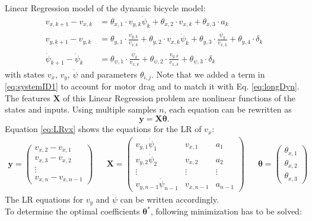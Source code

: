 Linear Regression model of the dynamic bicycle model:
\begin{subequations}\label{eq:systemID}
\begin{align}
    v_{x,k+1} - v_{x,k}&= \theta_{x,1} \cdot v_{y,k}\dot\psi_k + \theta_{x,2}\cdot v_{x,k}  + \theta_{x,3}\cdot a_k\label{eq:systemID1}\\
    v_{y,k+1}- v_{y,k} &= \theta_{y,1}\cdot  \frac{v_{y,k}}{v_{x,k}}+\theta_{y,2}\cdot v_{x,k}\dot\psi_k + \theta_{y,3}\cdot \frac{\dot\psi_k}{v_{x,k}}+\theta_{y,4}\cdot \delta_k\\
    \dot\psi_{k+1}-\dot\psi_k &= \theta_{\psi,1}\cdot \frac{\dot\psi_k}{v_{x,k}}+\theta_{\psi,2}\cdot \frac{v_{y,k}}{v_{x,k}}+\theta_{\psi,3}\cdot \delta_k
\end{align}
\end{subequations}
with states $v_x$, $v_y$, $\dot \psi$ and parameters $\theta_{i,j}$. Note that we added a term in \eqref{eq:systemID1} to account for motor drag and to match it with Eq. \eqref{eq:longDyn}. The features $\bm{X}$ of this Linear Regression problem are nonlinear functions of the states and inputs. Using multiple samples $n$, each equation can be rewritten as
\begin{equation}
\bm{y}=\bm{X\theta}.
\end{equation}
Equation \eqref{eq:LRvx} shows the equations for the LR of $v_x$:
\begin{align}
\label{eq:LRvx}
\bm{y} = \begin{pmatrix}
v_{x,2} - v_{x,1}\\
v_{x,3} - v_{x,2}\\
\vdots\\
v_{x,n} - v_{x,n-1}
\end{pmatrix} &&
\bm{X} = \begin{pmatrix}
v_{y,1}\dot\psi_1 & v_{x,1} & a_{1}\\
v_{y,2}\dot\psi_2 & v_{x,2} & a_{2}\\
\vdots&\vdots&\vdots\\
v_{y,n-1}\dot\psi_{n-1} & v_{x,n-1} & a_{n-1}
\end{pmatrix}&&
\bm{\theta}=\begin{pmatrix}
\theta_{x,1}\\
\theta_{x,2}\\
\theta_{x,3}
\end{pmatrix}
\end{align}
The LR equations for $v_y$ and $\dot\psi$ can be written accordingly.\\
To determine the optimal coefficients $\bm{\theta}^*$, following minimization has to be solved:
